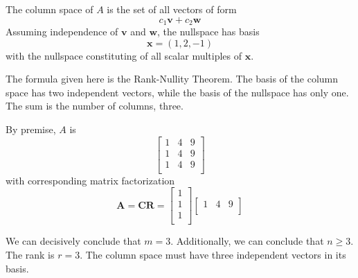\documentclass[a4paper]{article}
\begin{document}
The column space of \(A\) is the set of all vectors of form
\[
	c_{1} \bm{v} + c_{2} \bm{w}
\]
Assuming independence of \(\bm{v}\) and \(\bm{w}\), the nullspace has basis
\[
	\bm{x} = \!\left( 1, 2, -1 \right) 
\]
with the nullspace constituting of all scalar multiples of \(\bm{x}\).

The formula given here is the Rank-Nullity Theorem. The basis of the column space has two independent vectors, while the basis of the nullspace has only one. The sum is the number of columns, three.

\vspace{12pt}


By premise, \(A\) is
\[
	\begin{bmatrix}
		1 & 4 & 9 \\
		1 & 4 & 9 \\
		1 & 4 & 9 \\
	\end{bmatrix}
\]
with corresponding matrix factorization
\[
	\bm{A} = \bm{CR} = 
	\begin{bmatrix}
		1 \\
		1 \\
		1 \\
	\end{bmatrix}
\begin{bmatrix}
	1 & 4 & 9 \\
\end{bmatrix}
\]


We can decisively conclude that \(m = 3\). Additionally, we can conclude that \(n \ge 3\). The rank is \(r = 3\). The column space must have three independent vectors in its basis. 

\vspace{12pt}

\end{document}
